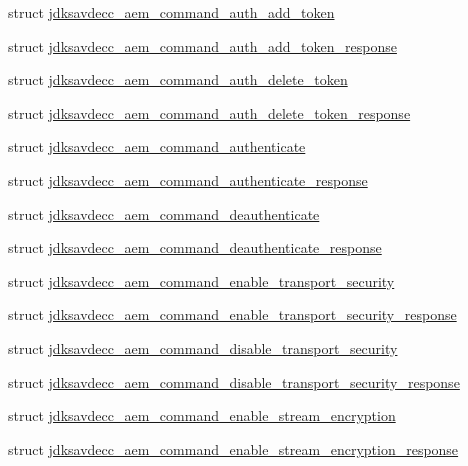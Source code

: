 \begin{DoxyCompactItemize}
\item 
struct \hyperlink{structjdksavdecc__aem__command__auth__add__token}{jdksavdecc\+\_\+aem\+\_\+command\+\_\+auth\+\_\+add\+\_\+token}
\item 
struct \hyperlink{structjdksavdecc__aem__command__auth__add__token__response}{jdksavdecc\+\_\+aem\+\_\+command\+\_\+auth\+\_\+add\+\_\+token\+\_\+response}
\item 
struct \hyperlink{structjdksavdecc__aem__command__auth__delete__token}{jdksavdecc\+\_\+aem\+\_\+command\+\_\+auth\+\_\+delete\+\_\+token}
\item 
struct \hyperlink{structjdksavdecc__aem__command__auth__delete__token__response}{jdksavdecc\+\_\+aem\+\_\+command\+\_\+auth\+\_\+delete\+\_\+token\+\_\+response}
\item 
struct \hyperlink{structjdksavdecc__aem__command__authenticate}{jdksavdecc\+\_\+aem\+\_\+command\+\_\+authenticate}
\item 
struct \hyperlink{structjdksavdecc__aem__command__authenticate__response}{jdksavdecc\+\_\+aem\+\_\+command\+\_\+authenticate\+\_\+response}
\item 
struct \hyperlink{structjdksavdecc__aem__command__deauthenticate}{jdksavdecc\+\_\+aem\+\_\+command\+\_\+deauthenticate}
\item 
struct \hyperlink{structjdksavdecc__aem__command__deauthenticate__response}{jdksavdecc\+\_\+aem\+\_\+command\+\_\+deauthenticate\+\_\+response}
\item 
struct \hyperlink{structjdksavdecc__aem__command__enable__transport__security}{jdksavdecc\+\_\+aem\+\_\+command\+\_\+enable\+\_\+transport\+\_\+security}
\item 
struct \hyperlink{structjdksavdecc__aem__command__enable__transport__security__response}{jdksavdecc\+\_\+aem\+\_\+command\+\_\+enable\+\_\+transport\+\_\+security\+\_\+response}
\item 
struct \hyperlink{structjdksavdecc__aem__command__disable__transport__security}{jdksavdecc\+\_\+aem\+\_\+command\+\_\+disable\+\_\+transport\+\_\+security}
\item 
struct \hyperlink{structjdksavdecc__aem__command__disable__transport__security__response}{jdksavdecc\+\_\+aem\+\_\+command\+\_\+disable\+\_\+transport\+\_\+security\+\_\+response}
\item 
struct \hyperlink{structjdksavdecc__aem__command__enable__stream__encryption}{jdksavdecc\+\_\+aem\+\_\+command\+\_\+enable\+\_\+stream\+\_\+encryption}
\item 
struct \hyperlink{structjdksavdecc__aem__command__enable__stream__encryption__response}{jdksavdecc\+\_\+aem\+\_\+command\+\_\+enable\+\_\+stream\+\_\+encryption\+\_\+response}

\end{DoxyCompactItemize}
